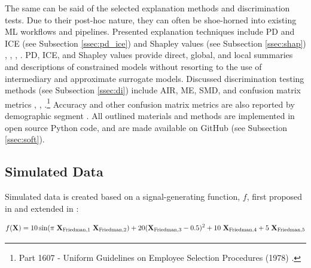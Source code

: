 \documentclass[information,article,submit,moreauthors,pdftex]{definitions/mdpi}
\begin{document}
The same can be said of the selected explanation methods and discrimination tests. Due to their post-hoc nature, they can often be shoe-horned into existing ML workflows and pipelines. Presented explanation techniques include PD and ICE (see Subsection \ref{ssec:pd_ice}) and Shapley values (see Subsection \ref{ssec:shap}) \cite{esl}, \cite{ice_plots}, \cite{shapley}, \cite{tree_shap}. PD, ICE, and Shapley values provide direct, global, and local summaries and descriptions of constrained models without resorting to the use of intermediary and approximate surrogate models. Discussed discrimination testing methods (see Subsection \ref{ssec:di}) include AIR, ME, SMD, and confusion matrix metrics \cite{feldman2015certifying}, \cite{cohen1988statistical}, \cite{cohen1992power}.\footnote{Part 1607 - Uniform Guidelines on Employee Selection Procedures (1978) .} Accuracy and other confusion matrix metrics are also reported by demographic segment \cite{zafar2017fairness}. All outlined materials and methods are implemented in open source Python code, and are made available on GitHub (see Subsection \ref{ssec:soft}). 


\subsection{Simulated Data}\label{ssec:sim_data}

Simulated data is created based on a signal-generating function, $f$, first proposed in \citet{friedman1979tree} and extended in \citet{friedman1991multivariate}:

\begin{equation}
\begin{aligned}\label{eq:sim}\small
f(\mathbf{X}) = 10\sin(\pi~\mathbf{X}_{\text{Friedman},1}~\mathbf{X}_{\text{Friedman},2}) + 20(\mathbf{X}_{\text{Friedman},3} - 0.5)^2 + 10~\mathbf{X}_{\text{Friedman},4} + 5~\mathbf{X}_{\text{Friedman},5}
\end{aligned}
\end{equation}
\end{document}
